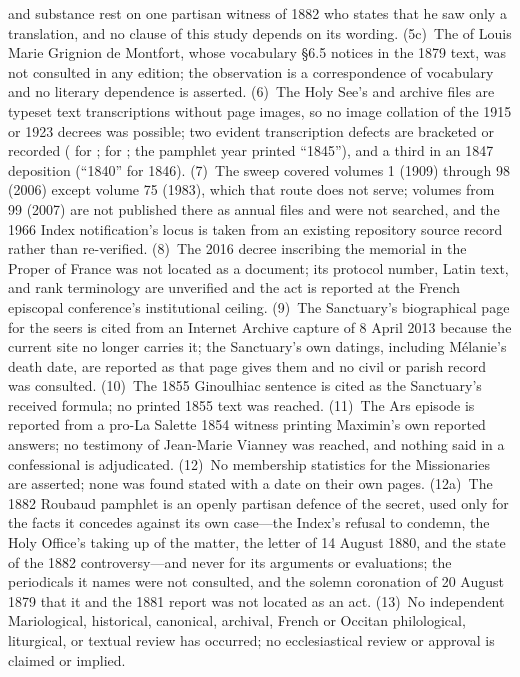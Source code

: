 and substance rest on one partisan witness of 1882 who states that
he saw only a translation, and no clause of this study depends on
its wording. (5c)~The  of Louis
Marie Grignion de Montfort, whose vocabulary \S6.5 notices in the
1879 text, was not consulted in any edition; the observation is a
correspondence of vocabulary and no literary dependence is asserted.
(6)~The Holy See's  and
 archive files are typeset text transcriptions without
page images, so no image collation of the 1915 or 1923 decrees was
possible; two evident transcription defects are bracketed or
recorded ( for ;  for
; the pamphlet year printed ``1845''), and a
third in an 1847 deposition (``1840'' for 1846). (7)~The 
sweep covered volumes 1 (1909) through 98 (2006) except volume 75
(1983), which that route does not serve; volumes from 99 (2007) are
not published there as annual files and were not searched, and the
1966 Index notification's locus is taken from an existing repository
source record rather than re-verified. (8)~The 2016 decree
inscribing the memorial in the Proper of France was not located as a
document; its protocol number, Latin text, and rank terminology are
unverified and the act is reported at the French episcopal
conference's institutional ceiling. (9)~The Sanctuary's biographical
page for the seers is cited from an Internet Archive capture of 8
April 2013 because the current site no longer carries it; the
Sanctuary's own datings, including Mélanie's death date, are reported
as that page gives them and no civil or parish record was consulted.
(10)~The 1855 Ginoulhiac sentence is cited as the Sanctuary's
received formula; no printed 1855 text was reached. (11)~The Ars
episode is reported from a pro-La Salette 1854 witness printing
Maximin's own reported answers; no testimony of Jean-Marie Vianney
was reached, and nothing said in a confessional is adjudicated.
(12)~No membership statistics for the Missionaries are asserted;
none was found stated with a date on their own pages. (12a)~The 1882
Roubaud pamphlet is an openly partisan defence of the secret, used
only for the facts it concedes against its own case---the Index's
refusal to condemn, the Holy Office's taking up of the matter, the
letter of 14 August 1880, and the state of the 1882
controversy---and never for its arguments or evaluations; the
periodicals it names were not consulted, and the solemn coronation
of 20 August 1879 that it and the 1881  report
was not located as an act. (13)~No
independent Mariological, historical, canonical, archival, French or
Occitan philological, liturgical, or textual review has occurred; no
ecclesiastical review or approval is claimed or implied.

